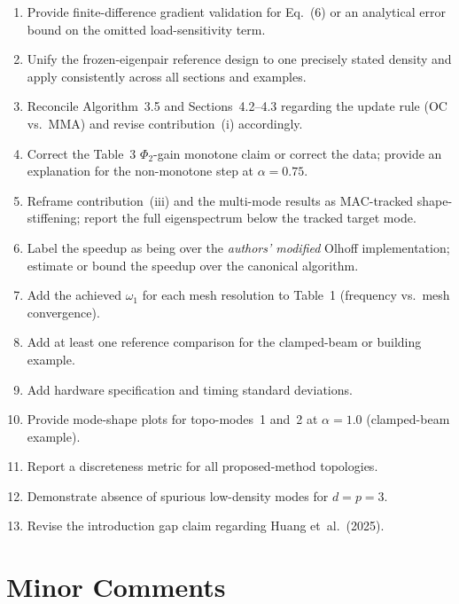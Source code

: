 \documentclass[11pt,a4paper]{article}
\begin{document}
\begin{enumerate}[label=\textbf{\arabic*.},nosep]
  \item Provide finite-difference gradient validation for Eq.~(6) or an analytical
    error bound on the omitted load-sensitivity term.
  \item Unify the frozen-eigenpair reference design to one precisely stated density
    and apply consistently across all sections and examples.
  \item Reconcile Algorithm~3.5 and Sections~4.2--4.3 regarding the update rule
    (OC vs.\ MMA) and revise contribution~(i) accordingly.
  \item Correct the Table~3 $\Phi_2$-gain monotone claim or correct the data; provide
    an explanation for the non-monotone step at $\alpha=0.75$.
  \item Reframe contribution~(iii) and the multi-mode results as MAC-tracked
    shape-stiffening; report the full eigenspectrum below the tracked target mode.
  \item Label the speedup as being over the \emph{authors' modified} Olhoff
    implementation; estimate or bound the speedup over the canonical algorithm.
  \item Add the achieved $\omega_1$ for each mesh resolution to Table~1 (frequency
    vs.\ mesh convergence).
  \item Add at least one reference comparison for the clamped-beam or building example.
  \item Add hardware specification and timing standard deviations.
  \item Provide mode-shape plots for topo-modes~1 and~2 at $\alpha=1.0$
    (clamped-beam example).
  \item Report a discreteness metric for all proposed-method topologies.
  \item Demonstrate absence of spurious low-density modes for $d=p=3$.
  \item Revise the introduction gap claim regarding Huang et~al.~(2025).
\end{enumerate}


\section{Minor Comments}
\end{document}

